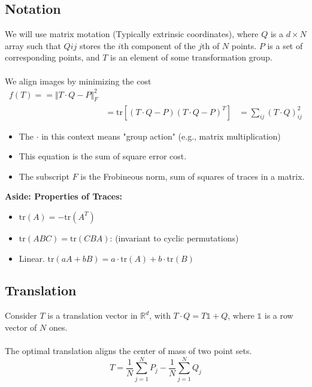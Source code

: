 \documentclass[10pt]{article}
\begin{document}
\subsection*{Notation}
We will use matrix motation (Typically extrinsic coordinates), where $Q$ is a $d \times N$ array such that $Q{ij}$ stores the $i$th component of the $j$th of $N$ points.  $P$ is a set of corresponding points, and $T$ is an element of some transformation group.\\\\
We align images by minimizing the cost
\begin{align*}
    f(T) == \Vert T \cdot Q - P \Vert_F^2\\
    &= \text{tr} \left[(T \cdot Q - P)(T \cdot Q-P)^T\right]
    &= \sum_{ij} (T \cdot Q)_{ij}^2
\end{align*}
\begin{itemize}
    \item The $\cdot$ in this context means "group action" (e.g., matrix multiplication)
    \item This equation is the sum of square error cost.
    \item The subscript $F$ is the Frobineous norm, sum of squares of traces in a matrix.
\end{itemize}
\textbf{Aside: Properties of Traces:}
\begin{itemize}
    \item $\text{tr}(A) = -\text{tr}(A^T)$
    \item $\text{tr}(ABC) = \text{tr}(CBA)$: (invariant to cyclic permutations)
    \item Linear.  $\text{tr}(aA + bB) = a \cdot \text{tr}(A) + b \cdot \text{tr}(B)$
\end{itemize}

\subsection*{Translation}
Consider $T$ is a translation vector in $\mathbb{R}^d$, with $T \cdot Q = T\mathds{1} + Q$, where $\mathds{1}$ is a row vector of $N$ ones.\\\\
The optimal translation aligns the center of mass of two point sets.
\[T = \frac{1}{N} \sum_{j = 1}^N P_j - \frac{1}{N} \sum_{j = 1}^N Q_j\]
\end{document}
